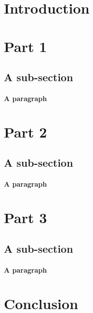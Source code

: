 \documentclass[11pt, oneside]{article}
\begin{document}
\section*{Introduction}

\section{Part 1}
\subsection{A sub-section}
\paragraph{A paragraph}

\section{Part 2}
\subsection{A sub-section}
\paragraph{A paragraph}

\section{Part 3}
\subsection{A sub-section}
\paragraph{A paragraph}

\section*{Conclusion}
\end{document}
